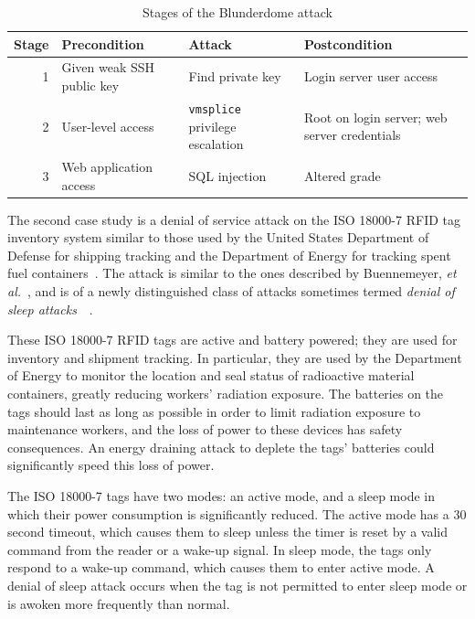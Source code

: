 \begin{table}
\centering
\begin{tabular}{r|p{1.25in}|p{1.35in}|p{1.75in}}
Stage & Precondition	&	Attack	&	Postcondition \\ \hline \hline
1 & \raggedright Given weak SSH public key
	& \raggedright Find private key &  Login server user access \\ \hline
2 & \raggedright User-level access & \raggedright \texttt{vmsplice} privilege escalation 
	& Root on login server; web server credentials \\ \hline
3 & \raggedright Web application access & \raggedright SQL injection & Altered grade
\end{tabular}
\caption{Stages of the Blunderdome attack}
\label{table:blundertasks}
\end{table}
\label{sec:bg:rfid}
The second case study is a denial of service attack
on the ISO 18000-7 RFID tag inventory system similar to those used by the United States
Department of Defense for shipping tracking and the Department of Energy for tracking spent
fuel containers~\cite{chen2009radiofrequency}. The attack
is similar to the ones described by Buennemeyer, \emph{et al.}~\cite{buennemeyer2006battery},
and is of a newly distinguished class of attacks sometimes termed \emph{denial
of sleep attacks}~\cite{brownfield2005wireless}~\cite{raymond2009effects}.

These ISO 18000-7 RFID tags are active and battery powered; they are used for inventory and
shipment tracking. In particular, they are used by the Department of Energy to monitor
the location and seal status of
radioactive material containers, greatly reducing workers' radiation exposure. 
The batteries on the tags should last as long as
possible in order to limit radiation exposure to maintenance workers, and
the loss of power to these devices has safety consequences.
An energy draining attack to deplete the tags' batteries could significantly
speed this loss of power.

The ISO 18000-7 tags have two modes: an active mode, and a sleep mode in which their
power consumption is significantly reduced. The active mode has a 30 second timeout,
which causes them to sleep unless the timer is reset by a valid
command from the reader or a wake-up signal. In sleep mode, the tags only respond to a
wake-up command, which causes them to enter active mode.
A denial of sleep attack occurs when the tag is not permitted to enter sleep mode or is
awoken more frequently than normal.

